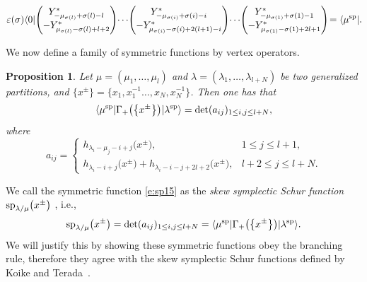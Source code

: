 \documentclass[10pt,a4paper]{amsart}
\numberwithin{equation}{section}
\newtheorem{Proposition}[Theorem]{Proposition}
 { \theoremstyle{definition}
\newtheorem{Definition}[Theorem]{Definition}
\newtheorem{Note}[Theorem]{Note}
\newtheorem{Example}[Theorem]{Example}
\newtheorem{Remark}[Theorem]{Remark} }
\begin{document}
\begin{align}\label{e:sp9}
\varepsilon(\sigma)\langle 0|\!\begin{pmatrix}{Y^*_{-\mu_{\sigma(l)}+\sigma(l)-l}}\\{-Y^*_{\mu_{\sigma(l)}-\sigma(l)+l+2}}\end{pmatrix}\!\cdots \! \begin{pmatrix}{Y^*_{-\mu_{\sigma(i)}+\sigma(i)-i}}\\{-Y^*_{\mu_{\sigma(i)}-\sigma(i)+2(l+1)-i}}\end{pmatrix}\!\cdots \! \begin{pmatrix}{Y^*_{-\mu_{\sigma(1)}+\sigma(1)-1}}\\{-Y^*_{\mu_{\sigma(1)}-\sigma(1)+2l+1}}\end{pmatrix}\!=\langle\mu^{\rm sp}|.\!
\end{align}

We now define a family of symmetric functions by vertex operators.

\begin{Proposition}\label{pro3}
Let $\mu=(\mu_1,\dots,\mu_l)$ and $\lambda=(\lambda_1,\dots,\lambda_{l+N})$ be two generalized partitions, and $\big\{x^{\pm}\big\}=\big\{x_1, x_1^{-1} \ldots, x_N, x_N^{-1}\big\}$. Then %
one has that
\begin{align}\label{e:sp15}
\langle\mu^{\rm sp}|\Gamma_+\big(\big\{x^{\pm}\big\}\big)|\lambda^{\rm sp}\rangle=\det(a_{ij})_{1\leq i,j\leq l+N},%
\end{align}
where
\begin{equation}\label{e:eq6}
a_{ij}=\begin{cases}
h_{\lambda_i-\mu_j-i+j}\big(x^{\pm}\big), & 1\leq j\leq l+1,\\
h_{\lambda_i-i+j}\big(x^{\pm}\big)+h_{\lambda_i-i-j+2l+2}\big(x^{\pm}\big), & l+2\leq j\leq l+N.
\end{cases}
\end{equation}
\end{Proposition}

We call the symmetric function \eqref{e:sp15} as the {\it skew symplectic Schur function} $ {\rm sp}_{\lambda/\mu}\big(x^{\pm}\big)$ , i.e.,
\begin{align}\label{e:sp21}
{\rm sp}_{\lambda/\mu}\big(x^{\pm}\big)=\det(a_{ij})_{1\leq i,j\leq l+N}=\langle\mu^{\rm sp}|\Gamma_+\big(\big\{x^{\pm}\big\}\big)|\lambda^{\rm sp}\rangle.
\end{align}
We will justify this by showing these symmetric functions obey the branching rule, therefore they agree with the skew symplectic Schur functions defined by Koike and Terada~\cite{KT1990}.
\end{document}
